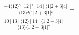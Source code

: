 \documentclass[varwidth, border=5pt]{standalone}
\begin{document}
\begin{my}
$\begin{gathered}
\scriptscriptstyle\frac{-4⟨12⟩³[12]²[14]⟨1|2+3|4]}{⟨13⟩²⟨1|2+3|1]³} +\\
\scriptscriptstyle\frac{10[13]⟨12⟩[14]⟨1|2+3|4]}{⟨13⟩⟨1|2+3|1]²} \phantom{+}
\end{gathered}$
\end{my}
\end{document}
